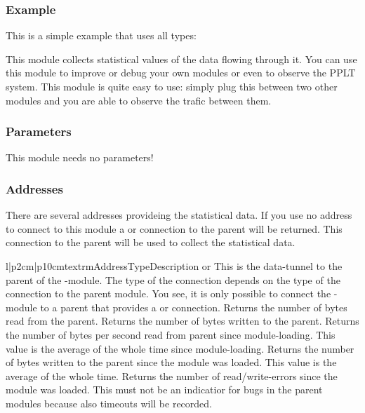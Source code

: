 {\subsubsection{Example}
This is a simple example that uses all types:




%
%
This module collects statistical values of the data flowing through it. You 
can use this module to improve or debug your own modules or even to observe
the PPLT system. This module is quite easy to use: simply plug this between 
two other modules and you are able to observe the trafic between them.

\subsubsection{Parameters}
This module needs no parameters!

\subsubsection{Addresses}
There are several addresses provideing the statistical data. If you use no 
address to connect to this module a  or  
connection to the parent will be returned. This connection to the parent will
be used to collect the statistical data. 

\begin{tableiii}{l|p{2cm}|p{10cm}}{textrm}{Address}{Type}{Description}
\lineiii{---}
        { or }
        {This is the data-tunnel to the parent of the 
         -module. The type of the connection depends on
         the type of the connection to the parent module. You see, it is only
         possible to connect the -module to a parent that
         provides a  or  connection.}
        {}
        {Returns the number of bytes read from the parent.}
        {}
        {Returns the number of bytes written to the parent.}
        {}
        {Returns the number of bytes per second read from parent since 
         module-loading. This value is the average of the whole time since
         module-loading.}
        {}
        {Returns the number of bytes written to the parent since the module 
        was loaded. This value is the average of the whole time.}
        {}
        {Returns the number of read/write-errors since the module was loaded.
         This must not be an indicatior for bugs in the parent modules because
         also timeouts will be recorded.}
\end{tableiii}

}
